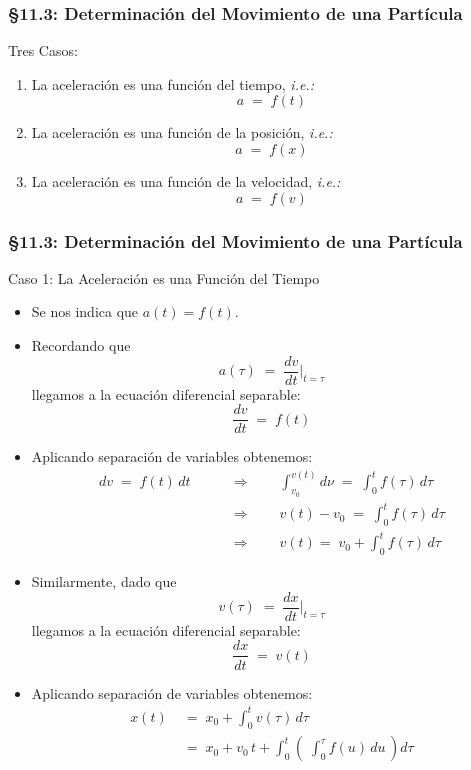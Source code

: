 \documentclass[ 10pt, xcolor = dvipsnames]{beamer}
\newcommand{\iec}{\textit{i.e.:\;}}
\begin{document}
\begin{frame}[allowframebreaks]
\frametitle{\S 11.3: Determinaci\'on del Movimiento de una Part\'icula}

Tres Casos: 
\begin{enumerate}
\item La aceleraci\'on es una funci\'on del tiempo, \iec 
\[
a \; = \; f(t)
\]
\item La aceleraci\'on es una funci\'on de la posici\'on, \iec 
\[
a \; = \; f(x)
\]
\item La aceleraci\'on es una funci\'on de la velocidad, \iec 
\[
a \; = \; f(v)
\]
\end{enumerate}

\end{frame}

\begin{frame}[allowframebreaks]
\frametitle{\S 11.3: Determinaci\'on del Movimiento de una Part\'icula}

Caso 1: La Aceleraci\'on es una Funci\'on del Tiempo
\begin{itemize}
\item Se nos indica que $a(t) = f(t)$. 
\item Recordando que  
\[
a(\tau) \; = \; \frac{dv}{dt} \bigg|_{ t = \tau }
\]
llegamos a la ecuaci\'on diferencial separable: 
\[
\frac{dv}{dt} \; = \; f(t)
\]
\framebreak
\item Aplicando separaci\'on de variables obtenemos: 
\begin{align*}
dv \; = \; f(t) \, dt \qquad 
& \Longrightarrow \qquad
\int_{v_0}^{v(t)} d\nu \; = \; \int_{0}^t f(\tau) \, d\tau \\[2ex]
& \Longrightarrow \qquad
v(t) - v_0 \; = \; \int_{0}^t f(\tau) \, d\tau \\[2ex]
& \Longrightarrow \qquad
v(t) = \; v_0 + \int_{0}^t f(\tau) \, d\tau
\end{align*}
\framebreak
\item Similarmente, dado que 
\[
v(\tau) \; = \; \frac{dx}{dt} \bigg|_{ t = \tau }
\]
llegamos a la ecuaci\'on diferencial separable: 
\[
\frac{dx}{dt} \; = \; v(t)
\]
\item Aplicando separaci\'on de variables obtenemos: 
\begin{align*}
x(t) \; 
& = \; x_0 + \int_{0}^{t} v(\tau) \, d\tau \\[2ex]
& = \; x_0 + v_0 \, t 
+ \int_0^t \left( \; \int_0^{\tau} f(u) \, du \, \right) d\tau
\end{align*}
\end{itemize}

\end{frame}
\end{document}
